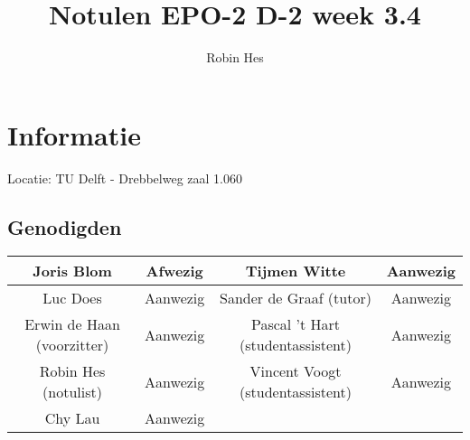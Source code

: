 \documentclass{report}
\begin{document}
\title{Notulen EPO-2 D-2 week 3.4}
\author{Robin Hes}
\maketitle
\section*{Informatie}
Locatie: TU Delft - Drebbelweg zaal 1.060
\subsection*{Genodigden}
\begin{center}
\begin{tabular}{|c |c |c |c |}
	\hline
	Joris Blom & Afwezig & Tijmen Witte & Aanwezig \\
	\hline
	Luc Does & Aanwezig & Sander de Graaf (tutor) & Aanwezig \\
	\hline
	Erwin de Haan (voorzitter) & Aanwezig & Pascal 't Hart (studentassistent) & Aanwezig \\
	\hline
	Robin Hes (notulist) & Aanwezig & Vincent Voogt (studentassistent) & Aanwezig \\
	\hline
	Chy Lau & Aanwezig & & \\
	\hline
\end{tabular}
\end{center}
\end{document}
